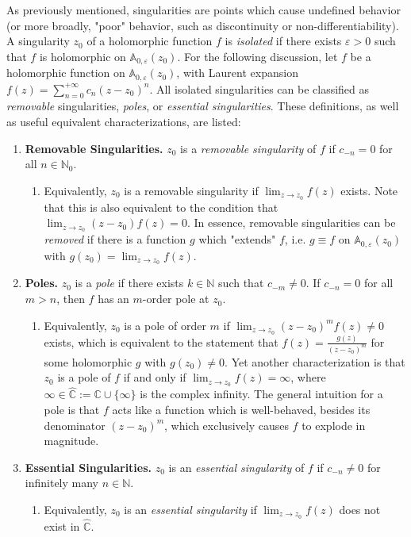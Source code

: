 As previously mentioned, singularities are points which cause undefined behavior (or more broadly, "poor" behavior, such as discontinuity or non-differentiability). A singularity $z_0$ of a holomorphic function $f$ is \textit{isolated} if there exists $\varepsilon>0$ such that $f$ is holomorphic on $\mathbb{A}_{0,\varepsilon}(z_0)$. For the following discussion, let $f$ be a holomorphic function on $\mathbb{A}_{0,\varepsilon}(z_0)$, with Laurent expansion $f(z) = \sum_{n=0}^{+\infty} c_n (z-z_0)^n$. All isolated singularities can be classified as \textit{removable} singularities, \textit{poles}, or \textit{essential singularities}. These definitions, as well as useful equivalent characterizations, are listed: \vspace{-1em}\begin{enumerate}
    \item[] \textbf{Removable Singularities.} $z_0$ is a \textit{removable singularity} of $f$ if $c_{-n}=0$ for all $n\in\mathbb{N}_0$. \begin{enumerate}
        \item[-] Equivalently, $z_0$ is a removable singularity if $\displaystyle\lim_{z\to z_0} f(z)$ exists. Note that this is also equivalent to the condition that $\displaystyle\lim_{z\to z_0} (z-z_0)f(z) = 0$. In essence, removable singularities can be \textit{removed} if there is a function $g$ which "extends" $f$, i.e. $g\equiv f$ on $\mathbb{A}_{0,\varepsilon}(z_0)$ with $g(z_0)=\displaystyle\lim_{z\to z_0} f(z)$.
    \end{enumerate}
    \item[] \textbf{Poles.} $z_0$ is a \textit{pole} if there exists $k\in\mathbb{N}$ such that $c_{-m}\neq 0$. If $c_{-n}=0$ for all $m>n$, then $f$ has an $m$-order pole at $z_0$. \begin{enumerate}
        \item[-] Equivalently, $z_0$ is a pole of order $m$ if $\displaystyle\lim_{z\to z_0}(z-z_0)^m f(z)\neq 0$ exists, which is equivalent to the statement that $f(z) = \frac{g(z)}{(z-z_0)^m}$ for some holomorphic $g$ with $g(z_0)\neq 0$. Yet another characterization is that $z_0$ is a pole of $f$ if and only if $\displaystyle\lim_{z\to z_0} f(z) = \infty$, where $\infty\in\hat{\mathbb{C}}:= \mathbb{C}\cup \{\infty\}$ is the complex infinity. The general intuition for a pole is that $f$ acts like a function which is well-behaved, besides its denominator $(z-z_0)^m$, which exclusively causes $f$ to explode in magnitude.
    \end{enumerate}
    \item[] \textbf{Essential Singularities.} $z_0$ is an \textit{essential singularity} of $f$ if $c_{-n}\neq 0$ for infinitely many $n\in\mathbb{N}$. \begin{enumerate}
        \item[-] Equivalently, $z_0$ is an \textit{essential singularity} if $\displaystyle\lim_{z\to z_0} f(z)$ does not exist in $\hat{\mathbb{C}}$.
    \end{enumerate}
\end{enumerate}

